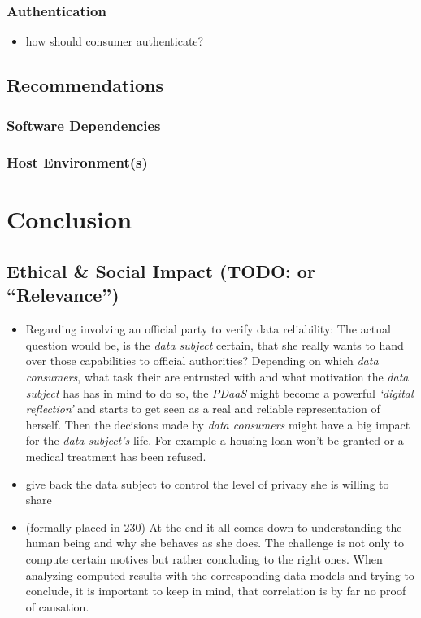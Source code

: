\documentclass[12pt,english,a4paper,titlepage,cleardoublepage=empty,dottedtoc]{report}
\providecommand{\tightlist}{%
  \setlength{\itemsep}{0pt}\setlength{\parskip}{0pt}}
\begin{document}
\subsection{Authentication}\label{authentication-1}

\begin{itemize}
\tightlist
\item
  how should consumer authenticate?
\end{itemize}

\section{Recommendations}\label{recommendations}

\subsection{Software Dependencies}\label{software-dependencies}

\subsection{Host Environment(s)}\label{host-environments}

\chapter{Conclusion}\label{conclusion}

\section{\texorpdfstring{Ethical \& Social Impact (TODO: or
``Relevance'')}{Ethical \& Social Impact (TODO: or Relevance)}}\label{ethical-social-impact-todo-or-relevance}

\begin{itemize}
\item
  Regarding involving an official party to verify data reliability: The
  actual question would be, is the \emph{data subject} certain, that she
  really wants to hand over those capabilities to official authorities?
  Depending on which \emph{data consumers}, what task their are
  entrusted with and what motivation the \emph{data subject} has has in
  mind to do so, the \emph{PDaaS} might become a powerful \emph{`digital
  reflection'} and starts to get seen as a real and reliable
  representation of herself. Then the decisions made by \emph{data
  consumers} might have a big impact for the \emph{data subject's} life.
  For example a housing loan won't be granted or a medical treatment has
  been refused.
\item
  give back the data subject to control the level of privacy she is
  willing to share
\item
  (formally placed in 230) At the end it all comes down to understanding
  the human being and why she behaves as she does. The challenge is not
  only to compute certain motives but rather concluding to the right
  ones. When analyzing computed results with the corresponding data
  models and trying to conclude, it is important to keep in mind, that
  correlation is by far no proof of causation.
\end{itemize}
\end{document}
